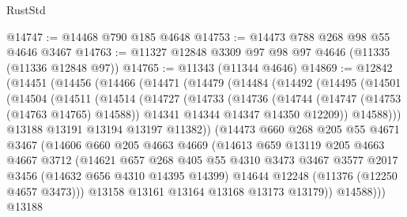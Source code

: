\begin{lexlean}{RustStd}
\begin{coremodule}
{\begin{coremodule}
{{{{{{{{{{{{{{{{{{{{{{{{{{{{{{{{{{{{{{{{{{{{{{{{{{{{{{{{{{{{{{{{{{{{{{{{{{{{{{{{{{{{{@14747 := @14468 @790 @185 @4648
@14753 := @14473 @788 @268 @98 @55 @4646 @3467
@14763 := @11327 @12848 @3309 @97 @98 @97 @4646 (@11335 (@11336 @12848 @97))
@14765 := @11343 (@11344 @4646)
@14869 := @12842
    (@14451
      (@14456
        (@14466
          (@14471
            (@14479
              (@14484
                (@14492
                  (@14495
                    (@14501
                      (@14504
                        (@14511
                          (@14514
                            (@14727
                              (@14733
                                (@14736
                                  (@14744
                                    (@14747 (@14753 (@14763 @14765) @14588))
                                    @14341
                                    @14344
                                    @14347
                                    @14350
                                    @12209))
                                @14588)))
                          @13188
                          @13191
                          @13194
                          @13197
                          @11382))
                      (@14473
                        @660
                        @268
                        @205
                        @55
                        @4671
                        @3467
                        (@14606
                          @660
                          @205
                          @4663
                          @4669
                          (@14613
                            @659
                            @13119
                            @205
                            @4663
                            @4667
                            @3712
                            (@14621
                              @657
                              @268
                              @405
                              @55
                              @4310
                              @3473
                              @3467
                              @3577
                              @2017
                              @3456
                              (@14632 @656 @4310 @14395 @14399)
                              @14644
                              @12248
                              (@11376 (@12250 @4657 @3473)))
                            @13158
                            @13161
                            @13164
                            @13168
                            @13173
                            @13179))
                        @14588)))
                  @13188
}}}}}}}}}}}}}}}}}}}}}}}}}}}}}}}}}}}}}}}}}}}}}}}}}}}}}}}}}}}}}}}}}}}}}}}}}}}}}}}}}}}}}
\end{coremodule}}
\end{coremodule}
\end{lexlean}
